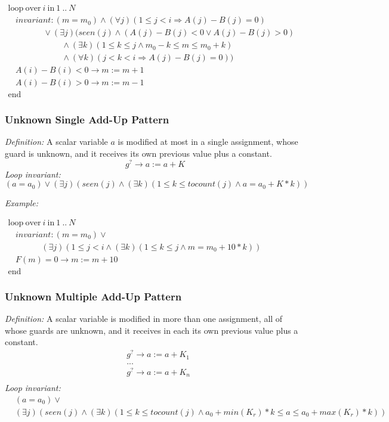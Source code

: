 \documentclass[a4paper,10pt]{article}
\newcommand{\KWloop}{\ensuremath{\mathrm{loop}~}}
\newcommand{\KWend}{\ensuremath{\mathrm{end}~}}
\newcommand{\KWover}{\ensuremath{\mathrm{over}~}}
\newcommand{\KWin}{\ensuremath{~\mathrm{in}~}}
\newcommand{\impl}{\ensuremath{\Longrightarrow}}
\newcommand{\seen}[1]{\ensuremath{\mathit{seen}(#1)}\xspace}
\newcommand{\tocount}[1]{\ensuremath{\mathit{tocount}(#1)}\xspace}
\newcommand{\loopinvariant}{\noindent\textit{Loop invariant:}\xspace}
\newcommand{\patterndef}{\noindent\textit{Definition:}\xspace}
\newcommand{\patternexample}{\noindent\textit{Example:}\xspace}
\begin{document}
\medskip
$\begin{array}{l}
  \KWloop \KWover i \KWin 1~..~N \\
  ~~~~ \textit{invariant}: (m = m_0) \land (\forall j)(1\leq j < i \impl A(j)-B(j) = 0)\\
  ~~~~~~~~~~~~~~~~~~~ \lor (\exists j)(\seen{j} \land (A(j)-B(j) < 0 \lor A(j)-B(j) > 0) \\
  ~~~~~~~~~~~~~~~~~~~~~~~~~~~~~ \land (\exists k)(1 \leq k \leq j \land m_0-k \leq m \leq m_0 +k) \\
  ~~~~~~~~~~~~~~~~~~~~~~~~~~~~~ \land (\forall k)(j < k < i \impl A(j)-B(j) = 0))\\
  ~~~~ A(i)-B(i) < 0 \rightarrow m := m+1\\
  ~~~~ A(i)-B(i) > 0 \rightarrow m := m-1\\
  \KWend
\end{array}$

\subsubsection*{Unknown Single Add-Up Pattern}

\patterndef A scalar variable $a$ is modified at most in a single assignment, whose
guard is unknown, and it receives its own previous value plus a constant.
%
$$g^? \rightarrow a := a + K$$
%
\loopinvariant
%
$$(a = a_0) \lor (\exists j)(\seen{j} \land (\exists k)(1 \leq k \leq \tocount{j} \land a = a_0 + K * k))$$

\bigskip
\patternexample

\medskip
$\begin{array}{l}
  \KWloop \KWover i \KWin 1~..~N \\
  ~~~~ \textit{invariant}: (m = m_0) \lor \\
  ~~~~~~~~~~~~~~~~~~ (\exists j)(1 \leq j < i \land (\exists k)(1 \leq k \leq j \land m = m_0+10*k))\\
  ~~~~ F(m)=0 \rightarrow m := m+10\\
  \KWend
\end{array}$

\subsubsection*{Unknown Multiple Add-Up Pattern}

\patterndef A scalar variable is modified in more than one assignment, all of
whose guards are unknown, and it receives in each its own previous value
plus a constant.
%
\begin{eqnarray*}
&g^? \rightarrow a := a + K_1\\
&...\\
&g^? \rightarrow a := a + K_n\\
\end{eqnarray*}
%
\loopinvariant
%
\begin{eqnarray*}
&(a = a_0) \lor\\
&(\exists j)(\seen{j} \land (\exists k)(1 \leq k \leq \tocount{j} \land a_0 + \mathit{min}(K_r)*k \leq a \leq a_0 + \mathit{max}(K_r)*k))\\
\end{eqnarray*}
\end{document}
